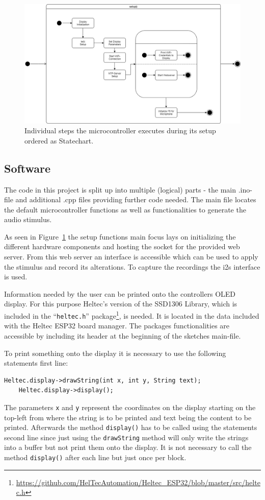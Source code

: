 \begin{figure}[H]
	\includegraphics[width=\linewidth]{Media/Controller_setup.png}
	\caption{Individual steps the microcontroller executes during its setup ordered as Statechart.}
	\label{fig:cntrlr_stp}
\end{figure}

\subsection{Software}
The code in this project is split up into multiple (logical) parts - the main .ino-file and additional .cpp files providing further code needed.
The main file locates the default microcontroller functions as well as functionalities to generate the audio stimulus.

As seen in Figure~\ref{fig:cntrlr_stp} the setup functions main focus lays on initializing the different hardware components and hosting the socket for the provided web server.
From this web server an interface is accessible which can be used to apply the stimulus and record its alterations.
To capture the recordings the i2s interface is used.

Information needed by the user can be printed onto the controllers OLED display.
For this purpose Heltec's version of the SSD1306 Library, which is included in the \enquote{\texttt{heltec.h}} package\footnote{\url{https://github.com/HelTecAutomation/Heltec_ESP32/blob/master/src/heltec.h}}, is needed.
It is located in the data included with the Heltec ESP32 board manager.
The packages functionalities are accessible by including its header at the beginning of the sketches main-file.

To print something onto the display it is necessary to use the following statements first line:
\begin{lstlisting}[style=inText]
	Heltec.display->drawString(int x, int y, String text);
	Heltec.display->display();
\end{lstlisting}
The parameters \texttt{x} and \texttt{y} represent the coordinates on the display starting on the top-left from where the string is to be printed and text being the content to be printed.
Afterwards the method \texttt{display()} has to be called using the  statements second line since just using the \texttt{drawString} method will only write the strings into a buffer but not print them onto the
display.
It is not necessary to call the method \texttt{display()} after each line but just once per block.

